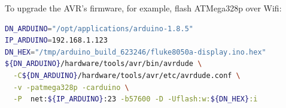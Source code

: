 \documentclass[a4paper,10pt]{article}
\begin{document}
To upgrade the AVR's firmware, for example,
flash ATMega328p over Wifi:
\begin{lstlisting}[language=bash]
DN_ARDUINO="/opt/applications/arduino-1.8.5"
IP_ARDUINO=192.168.1.123
DN_HEX="/tmp/arduino_build_623246/fluke8050a-display.ino.hex"
${DN_ARDUINO}/hardware/tools/avr/bin/avrdude \
  -C${DN_ARDUINO}/hardware/tools/avr/etc/avrdude.conf \
  -v -patmega328p -carduino \
  -P  net:${IP_ARDUINO}:23 -b57600 -D -Uflash:w:${DN_HEX}:i
\end{lstlisting}
\end{document}
